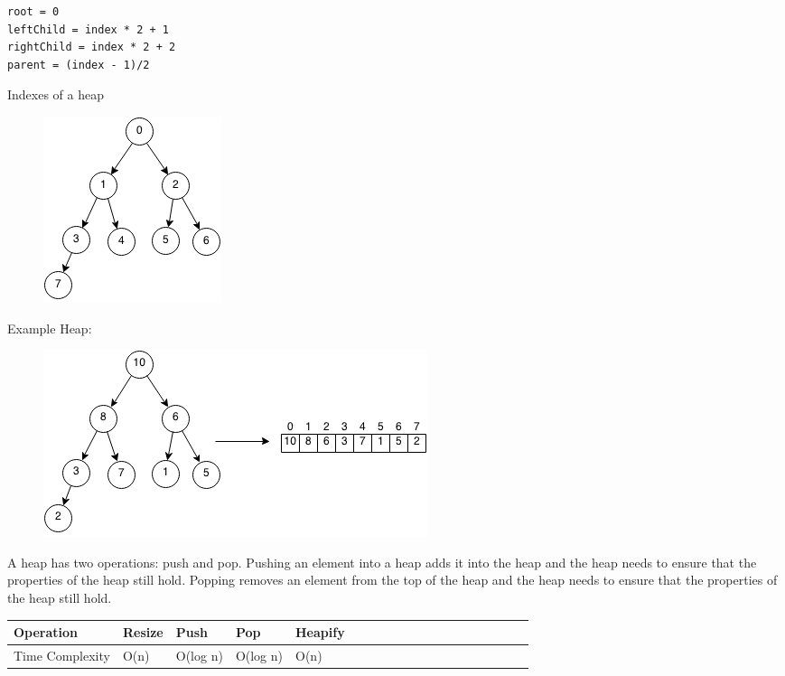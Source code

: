 \documentclass[11pt,oneside]{book}
\makeatletter
\def\maxwidth#1{\ifdim\Gin@nat@width>#1 #1\else\Gin@nat@width\fi}
\makeatother
\begin{document}
\begin{lstlisting}
root = 0
leftChild = index * 2 + 1
rightChild = index * 2 + 2
parent = (index - 1)/2
\end{lstlisting}

Indexes of a heap

\vspace{5px}\begin{figure}[H]\centering
        \includegraphics[width=0.66\maxwidth{\textwidth}]{maxheap2.png}
        \end{figure}

Example Heap:

\vspace{5px}\begin{figure}[H]\centering
        \includegraphics[width=0.66\maxwidth{\textwidth}]{maxheap.png}
        \end{figure}

A heap has two operations: push and pop. Pushing an element into a heap adds it into the heap and the heap needs to ensure that the properties of the heap still hold. Popping removes an element from the top of the heap and the heap needs to ensure that the properties of the heap still hold.

\vspace{10px}\begin{tabulary}{0.4\linewidth}{|l|l|l|l|l|l|l|l|l|l|l|l|l|l|l|l|l|l|l}\hline


  Operation &
  Resize &
  Push &
  Pop &
  Heapify\\
\hline


  Time Complexity &
  O(n) &
  O(log n) &
  O(log n) &
  O(n)\\

\hline\end{tabulary}
\end{document}
